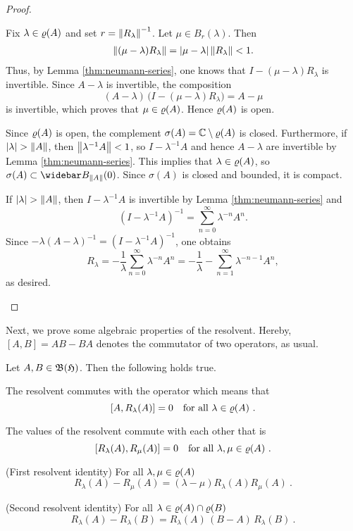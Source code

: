 \begin{proof}
 \begin{adromanlist}
 \item 
 Fix $\lambda \in \varrho(A)$ and set $r = \left\|R_{\lambda}\right\|^{-1}$. Let $\mu \in B_r(\lambda)$. Then
\begin{align*}
 \left\|(\mu - \lambda)R_{\lambda}\right\| = {\left|\mu - \lambda\right|} \left\|R_{\lambda}\right\| < 1.
\end{align*}
Thus, by Lemma \ref{thm:neumann-series}, one knows that $I - (\mu - \lambda)R_{\lambda}$ is invertible. Since $A - \lambda$ is invertible,
the composition
\[
(A - \lambda) \, \big( I - (\mu - \lambda)R_{\lambda} \big) = A - \mu
\]
is invertible, which proves that $\mu \in \varrho(A)$. Hence $\varrho(A)$ is open.


\item Since $\varrho(A)$ is open, the complement $\sigma(A) = \mathbb{C} \setminus \varrho(A)$ is closed. Furthermore, if ${\left|\lambda\right|} > \left\|A\right\|$, then $\left\|\lambda^{-1}A\right\| < 1$, so $I - \lambda^{-1}A$ and hence $A - \lambda$ are invertible by Lemma \ref{thm:neumann-series}. This implies that $\lambda \in \varrho(A)$, so $\sigma(A) \subset \closure{B}_{\norm{A}}(0)$. Since $\sigma(A)$ is closed and bounded, it is compact.
\item If ${\left|\lambda\right|} > \left\|A\right\|$, then $I - \lambda^{-1}A$ is invertible by Lemma \ref{thm:neumann-series} and
\[
(I - \lambda^{-1}A)^{-1} = \sum_{n=0}^\infty \lambda^{-n}A^n.
\]
Since $-\lambda(A - \lambda)^{-1} = (I - \lambda^{-1}A)^{-1}$, one obtains
\[
R_\lambda = -\frac{1}{\lambda}\sum_{n=0}^\infty \lambda^{-n}A^n = -\frac{1}{\lambda} - \sum_{n=1}^\infty \lambda^{-n-1}A^n,
\]
as desired.   
\end{adromanlist}
\end{proof}

Next, we prove some algebraic properties of the resolvent. Hereby, $[A,B] = AB - BA$ denotes the commutator of two operators,
as usual.

\begin{proposition}\label{thm:resolvent-algebraic-properties}
Let $A,B \in \mathfrak{B}(\mathfrak{H})$. Then the following holds true.
\begin{romanlist}
\item\label{ite:commutativity-resolvent-operator} The resolvent commutes with the operator which means that
  \[ [A, R_\lambda(A) ] = 0 \quad\text{for all } \lambda \in \varrho(A) \ . \]
\item\label{ite:commutativity-resolvent-itself}
   The values of the resolvent commute with each other that is
 \[ [R_\lambda (A), R_\mu (A)] = 0 \quad\text{for all } \lambda,\mu \in \varrho(A) \ . \]
\item\label{ite:first-resolvent-identity}\textup{({\sffamily First resolvent identity})} For all $\lambda, \mu \in \varrho(A)$
  \[ R_\lambda(A) - R_\mu (A)= (\lambda - \mu)R_\lambda(A) R_\mu(A) \ . \]
\item\textup{({\sffamily Second resolvent identity})} For all $\lambda \in \varrho(A)\cap \varrho(B)$
  \[ R_\lambda (A)- R_\lambda (B) = R_\lambda(A)\, (B-A) \, R_\lambda (B) \ . \] 
\end{romanlist}
\end{proposition}

